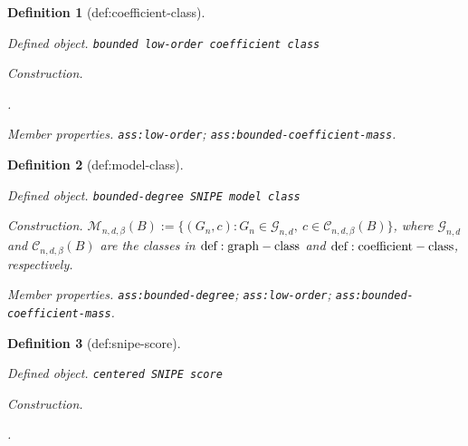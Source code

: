 \documentclass{article}
\newtheorem{definition}{Definition}
\begin{document}
\begin{definition}[def:coefficient-class]\label{def:coefficient-class}
\par\smallskip\noindent\emph{Defined object.} \texttt{bounded low-\allowbreak{}order coefficient class}
\par\smallskip\noindent\emph{Construction.} \par\noindent {}\par\noindent.
\par\smallskip\noindent\emph{Member properties.} \texttt{ass:\allowbreak{}low-\allowbreak{}order}; \texttt{ass:\allowbreak{}bounded-\allowbreak{}coefficient-\allowbreak{}mass}.
\end{definition}

\begin{definition}[def:model-class]\label{def:model-class}
\par\smallskip\noindent\emph{Defined object.} \texttt{bounded-\allowbreak{}degree SNIPE model class}
\par\smallskip\noindent\emph{Construction.} \(\mathcal M_{n,d,\beta}(B):=\{(G_n,c):G_n\in\mathcal G_{n,d},\ c\in\mathcal C_{n,d,\beta}(B)\}\), where \(\mathcal G_{n,d}\) and \(\mathcal C_{n,d,\beta}(B)\) are the classes in \({\rm def:graph-class}\) and \({\rm def:coefficient-class}\), respectively.
\par\smallskip\noindent\emph{Member properties.} \texttt{ass:\allowbreak{}bounded-\allowbreak{}degree}; \texttt{ass:\allowbreak{}low-\allowbreak{}order}; \texttt{ass:\allowbreak{}bounded-\allowbreak{}coefficient-\allowbreak{}mass}.
\end{definition}

\begin{definition}[def:snipe-score]\label{def:snipe-score}
\par\smallskip\noindent\emph{Defined object.} \texttt{centered SNIPE score}
\par\smallskip\noindent\emph{Construction.} \par\noindent {}\par\noindent.
\end{definition}
\end{document}
